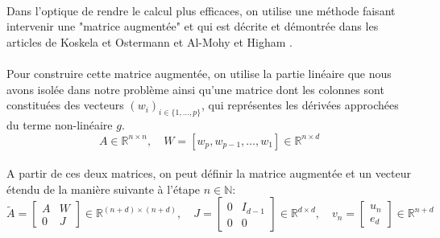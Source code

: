        \paragraph{}
        Dans l'optique de rendre le calcul plus efficaces, on utilise une méthode faisant intervenir une "matrice augmentée" et qui est décrite et démontrée dans les articles de Koskela et Ostermann \cite{Taylor} et Al-Mohy et Higham \cite{ExpIntegrators}.

        \paragraph{}
        Pour construire cette matrice augmentée, on utilise la partie linéaire que nous avons isolée dans notre problème ainsi qu'une matrice dont les colonnes sont constituées des vecteurs $(w_i)_{i\in\{1,...,p\}}$, qui représentes les dérivées approchées du terme non-linéaire $g$.
        \begin{equation}
            A \in \mathbb{R}^{n \times n}, \quad W=\left[w_{p}, w_{p-1}, \ldots, w_{1}\right] \in \mathbb{R}^{n \times d}
        \end{equation}

        \paragraph{}
        A partir de ces deux matrices, on peut définir la matrice augmentée et un vecteur étendu de la manière suivante à l'étape $n\in \mathbb{N}$:
        \begin{equation} 
            \widetilde{A} =
            \begin{bmatrix}
                A & W \\
                0 & J
            \end{bmatrix}
            \in \mathbb{R}^{(n+d) \times(n+d)},
            \quad J =
            \begin{bmatrix}
                0 & I_{d-1} \\
                0 & 0
            \end{bmatrix}
            \in \mathbb{R}^{d \times d},
            \quad v_{n} =
            \begin{bmatrix}
                u_{n} \\
                e_{d}
            \end{bmatrix}
            \in \mathbb{R}^{n+d}
        \end{equation}

